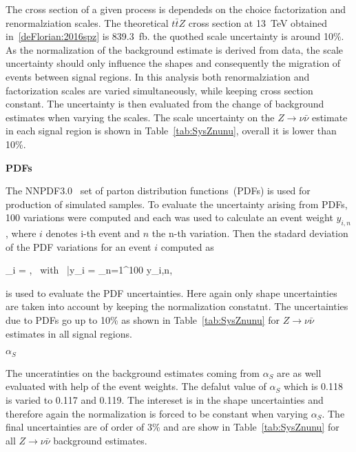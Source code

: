 The cross section of a given process is dependeds on the choice factorization and renormalziation scales. The theoretical $t\bar{t}Z$ cross section at 13~TeV obtained in~\ref{deFlorian:2016spz} is 839.3~fb. the quothed scale uncertainty is around 10\%. As the normalization of the background estimate is derived from data, the scale uncertainty should only influence the shapes and consequently the migration of events between signal regions. In this analysis both renormalziation and factorization scales are varied simultaneously, while keeping cross section constant. The uncertainty is then evaluated from the change of background estimates when varying the scales. The scale uncertainty on the $Z \to \nu \bar{\nu}$ estimate in  each signal region is shown in Table~\ref{tab:SysZnunu}, overall it is lower than 10\%.


\textbf{PDFs}


The NNPDF3.0~\cite{Ball:2014uwa} set of parton distribution functions~(PDFs) is used for production of simulated samples. To evaluate the uncertainty arising from PDFs, 100 variations were computed and each was used to calculate an event weight $y_{i,n}$, where $i$ denotes i-th event and $n$ the n-th variation. Then the stadard deviation of the PDF variations for an event $i$ computed as

{
\sigma_{i} = , ~with~ \bar{y}_{i} =  \sum_{n=1}^{100} y_{i,n},
}

is used to evaluate the PDF uncertainties. Here again only shape uncertainties are taken into account by keeping the normalization constatnt. The uncertainties due to PDFs go up to 10\% as shown in Table~\ref{tab:SysZnunu} for $Z \to \nu \bar{\nu}$ estimates in all signal regions.

\textbf{$\alpha_{S}$}

The unceratinties on the background estimates coming from $\alpha_{S}$ are as well evaluated with help of the event weights. The defalut value of $\alpha_{S}$ which is 0.118 is varied to 0.117 and 0.119.  The intereset is in the shape uncertainties and therefore again the normalization is forced to be constant when varying $\alpha_{S}$. The final uncertainties are of order of 3\% and are show in Table~\ref{tab:SysZnunu} for all $Z \to \nu \bar{\nu}$ background estimates.


